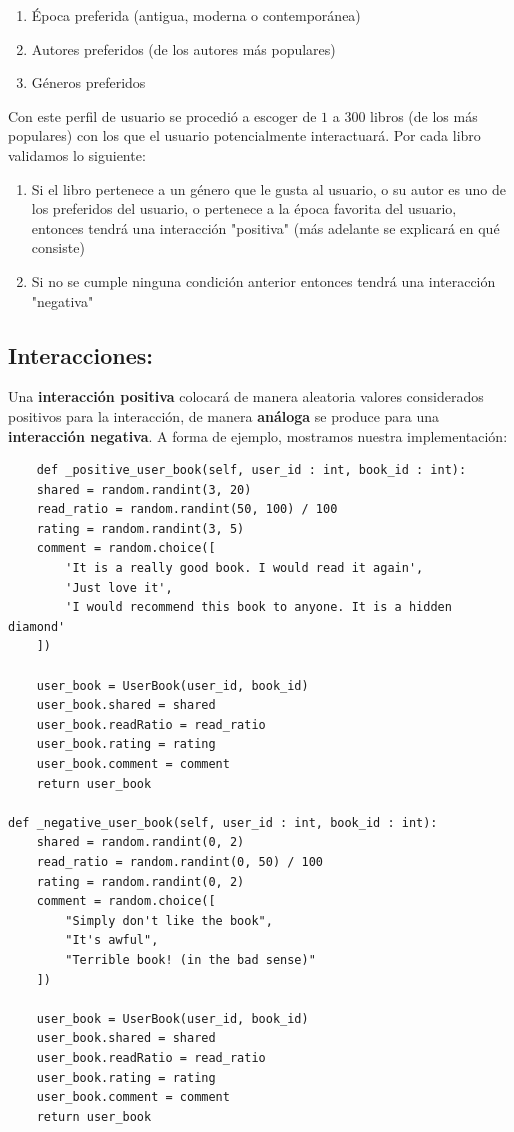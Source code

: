 \documentclass[14pt]{extarticle}
\begin{document}
\begin{enumerate}
    \item Época preferida (antigua, moderna o contemporánea)
    \item Autores preferidos (de los autores más populares)
    \item Géneros preferidos
\end{enumerate}

Con este perfil de usuario se procedió a escoger de $1$ a $300$ libros (de los más populares) con los que el usuario potencialmente interactuará. Por cada libro validamos lo siguiente:

\begin{enumerate}
    \item Si el libro pertenece a un género que le gusta al usuario, o su autor es uno de los preferidos del usuario, o pertenece a la época favorita del usuario, entonces tendrá una interacción "positiva" (más adelante se explicará en qué consiste)
    \item Si no se cumple ninguna condición anterior entonces tendrá una interacción "negativa"
\end{enumerate}

\subsection{Interacciones:}

Una \textbf{interacción positiva} colocará de manera aleatoria valores considerados positivos para la interacción, de manera \textbf{análoga} se produce para una \textbf{interacción negativa}. A forma de ejemplo, mostramos nuestra implementación:

\begin{verbatim}
    def _positive_user_book(self, user_id : int, book_id : int):
    shared = random.randint(3, 20)
    read_ratio = random.randint(50, 100) / 100
    rating = random.randint(3, 5)
    comment = random.choice([
        'It is a really good book. I would read it again',
        'Just love it',
        'I would recommend this book to anyone. It is a hidden diamond'
    ])

    user_book = UserBook(user_id, book_id)
    user_book.shared = shared
    user_book.readRatio = read_ratio
    user_book.rating = rating
    user_book.comment = comment
    return user_book

def _negative_user_book(self, user_id : int, book_id : int):
    shared = random.randint(0, 2)
    read_ratio = random.randint(0, 50) / 100
    rating = random.randint(0, 2)
    comment = random.choice([
        "Simply don't like the book",
        "It's awful",
        "Terrible book! (in the bad sense)"
    ])

    user_book = UserBook(user_id, book_id)
    user_book.shared = shared
    user_book.readRatio = read_ratio
    user_book.rating = rating
    user_book.comment = comment
    return user_book    
\end{verbatim}
\end{document}
